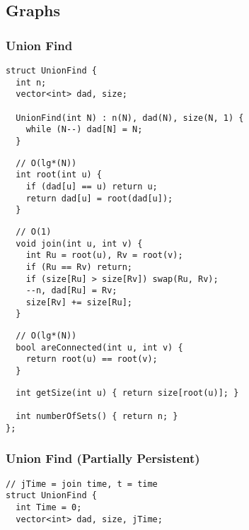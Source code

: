 \documentclass[twoside]{article}
\begin{document}
\begin{multicols*}{2}
\subsection*{Graphs}
\vspace{2em}
\subsubsectionfont{\large\bfseries\sffamily\underline}
\subsubsection*{Union Find}
\begin{verbatim}
struct UnionFind {
  int n;
  vector<int> dad, size;

  UnionFind(int N) : n(N), dad(N), size(N, 1) {
    while (N--) dad[N] = N;
  }
\end{verbatim}
\vspace{-12pt}
\begin{verbatim}
  // O(lg*(N))
  int root(int u) {
    if (dad[u] == u) return u;
    return dad[u] = root(dad[u]);
  }
\end{verbatim}
\vspace{-12pt}
\begin{verbatim}
  // O(1)
  void join(int u, int v) {
    int Ru = root(u), Rv = root(v);
    if (Ru == Rv) return;
    if (size[Ru] > size[Rv]) swap(Ru, Rv);
    --n, dad[Ru] = Rv;
    size[Rv] += size[Ru];
  }
\end{verbatim}
\vspace{-12pt}
\begin{verbatim}
  // O(lg*(N))
  bool areConnected(int u, int v) {
    return root(u) == root(v);
  }
\end{verbatim}
\vspace{-12pt}
\begin{verbatim}
  int getSize(int u) { return size[root(u)]; }

  int numberOfSets() { return n; }
};
\end{verbatim}

\subsubsectionfont{\large\bfseries\sffamily\underline}
\subsubsection*{Union Find (Partially Persistent)}
\begin{verbatim}
// jTime = join time, t = time
struct UnionFind {
  int Time = 0;
  vector<int> dad, size, jTime;


\end{verbatim}
\end{multicols*}
\end{document}
